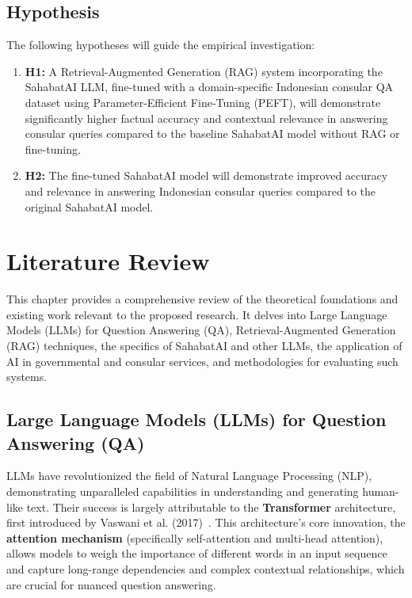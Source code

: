 \documentclass[12pt]{report}
\begin{document}
\section{Hypothesis}

The following hypotheses will guide the empirical investigation:
\begin{enumerate}
    \item \textbf{H1:} A Retrieval-Augmented Generation (RAG) system incorporating the SahabatAI LLM, fine-tuned with a domain-specific Indonesian consular QA dataset using Parameter-Efficient Fine-Tuning (PEFT), will demonstrate significantly higher factual accuracy and contextual relevance in answering consular queries compared to the baseline SahabatAI model without RAG or fine-tuning.
    \item \textbf{H2:} The fine-tuned SahabatAI model will demonstrate improved accuracy and relevance in answering Indonesian consular queries compared to the original SahabatAI model.
\end{enumerate}

\chapter{Literature Review}

This chapter provides a comprehensive review of the theoretical foundations and existing work relevant to the proposed research. It delves into Large Language Models (LLMs) for Question Answering (QA), Retrieval-Augmented Generation (RAG) techniques, the specifics of SahabatAI and other LLMs, the application of AI in governmental and consular services, and methodologies for evaluating such systems.

\section{Large Language Models (LLMs) for Question Answering (QA)}

LLMs have revolutionized the field of Natural Language Processing (NLP), demonstrating unparalleled capabilities in understanding and generating human-like text. Their success is largely attributable to the \textbf{Transformer} architecture, first introduced by Vaswani et al. (2017)~\cite{NIPS2017_3f5ee243}. This architecture's core innovation, the \textbf{attention mechanism} (specifically self-attention and multi-head attention), allows models to weigh the importance of different words in an input sequence and capture long-range dependencies and complex contextual relationships, which are crucial for nuanced question answering.
\end{document}
